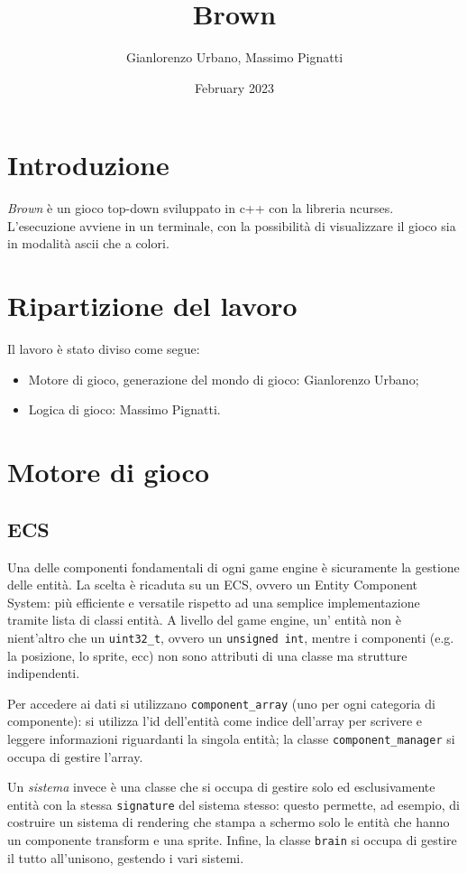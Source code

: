 \documentclass{article}
\title{Brown}
\author{Gianlorenzo Urbano, Massimo Pignatti}
\date{February 2023}
\begin{document}
\maketitle

\section{Introduzione}

\emph{Brown} è un gioco top-down sviluppato in c++ con la libreria ncurses. L'esecuzione avviene in un terminale, con la possibilità di visualizzare il gioco sia in modalità ascii che a colori.

\section{Ripartizione del lavoro}
Il lavoro è stato diviso come segue:
\begin{itemize}
    \item Motore di gioco, generazione del mondo di gioco: Gianlorenzo Urbano;
    \item Logica di gioco: Massimo Pignatti.
\end{itemize}

\section{Motore di gioco}

\subsection{ECS}
Una delle componenti fondamentali di ogni game engine è sicuramente la gestione delle entità.
La scelta è ricaduta su un ECS, ovvero un Entity Component System: più efficiente e versatile rispetto ad una semplice implementazione tramite lista di classi entità.
A livello del game engine, un' entità non è nient'altro che un \verb|uint32_t|, ovvero un \verb|unsigned int|, mentre i componenti (e.g. la posizione, lo sprite, ecc) non sono attributi di una classe ma strutture indipendenti.

Per accedere ai dati si utilizzano \verb|component_array| (uno per ogni categoria di componente): si utilizza l'id dell'entità come indice dell'array per scrivere e leggere informazioni riguardanti la singola entità; la classe \verb!component_manager! si occupa di gestire l'array.

Un \emph{sistema} invece è una classe che si occupa di gestire solo ed esclusivamente entità con la stessa \verb|signature| del sistema stesso: questo permette, ad esempio, di costruire un sistema di rendering che stampa a schermo solo le entità che hanno un componente transform e una sprite.
Infine, la classe \verb|brain| si occupa di gestire il tutto all'unisono, gestendo i vari sistemi.
\end{document}
